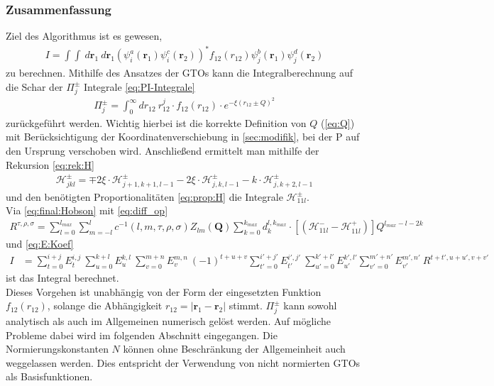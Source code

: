 \subsubsection{Zusammenfassung}\label{sec:Zusammenfassung:Algorithmus}
%
Ziel des Algorithmus ist es gewesen, 
%
\begin{align}\nonumber
I= \int \int\ 
d\textbf{r}_1\ d\textbf{r}_1 
(\psi_i^a(\textbf{r}_1)\psi_i^c(\textbf{r}_2))^* f_{12}(r_{12}) 
\psi_j^b(\textbf{r}_1)\psi_j^d(\textbf{r}_2)
\end{align}
%
zu berechnen. Mithilfe des Ansatzes der GTOs kann die Integralberechnung   
auf die Schar der $\Pi_j^\pm$ Integrale \ref{eq:PI-Integrale}
%
\begin{align}\nonumber
\Pi_j^\pm= \int_{0}^{\infty}dr_{12}\ r_{12}^j \cdot f_{12}(r_{12}) \cdot 
e^{-\xi (r_{12} \pm Q)^2}
\end{align}
% 
zurückgeführt werden. Wichtig hierbei ist die korrekte Definition von $Q$ 
(\ref{eq:Q}) mit Berücksichtigung der Koordinatenverschiebung in 
\ref{sec:modifik}, bei der P auf den Ursprung verschoben 
wird. Anschließend 
ermittelt man mithilfe der Rekursion \ref{eq:rek:H}
%
\begin{align}\nonumber
\mathcal{H}_{jkl}^{\pm} = \mp 2\xi\cdot \mathcal{H}_{j+1,k+1,l-1}^\pm-2\xi\cdot 
\mathcal{H}_{j,k,l-1}^\pm-k\cdot\mathcal{H}_{j,k+2,l-1}^\pm
\end{align}
%
und den benötigten Proportionalitäten \ref{eq:prop:H} die Integrale 
$\mathcal{H}_{11l}^\pm$. \\
Via \ref{eq:final:Hobson} mit \ref{eq:diff_op}
%
\begin{align}\label{R_sum}
R^{\tau,\rho,\sigma}=\sum_{l=0}^{l_{max}}\sum_{m=-l}^{l}c^{-1}(l,m,\tau,\rho,\sigma)Z_{lm}(\textbf{Q})
\sum_{k=0}^{k_{max}}d_k^{l,k_{max}} \cdot 
\left[(\mathcal{H}^-_{11l}-\mathcal{H}^+_{11l})\right]Q^{l_{max}-l-2k}
\end{align}
%
und \ref{eq:E:Koef} 
%
\begin{align}\nonumber 
I &= %
\sum_{t=0}^{i+j}E^{i,j}_t\ \sum_{u=0}^{k+l}E^{k,l}_u\ 
\sum_{v=0}^{m+n}E^{m,n}_v\ (-1)^{t+u+v} \sum_{t'=0}^{i'+j'}E^{i',j'}_{t'}\ 
\sum_{u'=0}^{k'+l'}E^{k',l'}_{u'} \sum_{v'=0}^{m'+n'}E^{m',n'}_{v'}\ 
R^{t+t',u+u',v+v'}
\end{align}
%
ist das Integral berechnet. \\

Dieses Vorgehen ist unabhängig von der Form der eingesetzten Funktion 
$f_{12}(r_{12})$, solange die Abhängigkeit $r_{12}=|\textbf{r}_1-\textbf{r}_2|$ 
stimmt. $\Pi^\pm_j$ kann sowohl analytisch als auch im Allgemeinen numerisch 
gelöst werden. Auf mögliche Probleme dabei wird im folgenden Abschnitt 
eingegangen. Die Normierungskonstanten $N$ können ohne Beschränkung der 
Allgemeinheit auch weggelassen werden. Dies entspricht der Verwendung von 
nicht normierten GTOs als Basisfunktionen.
%
%
%
